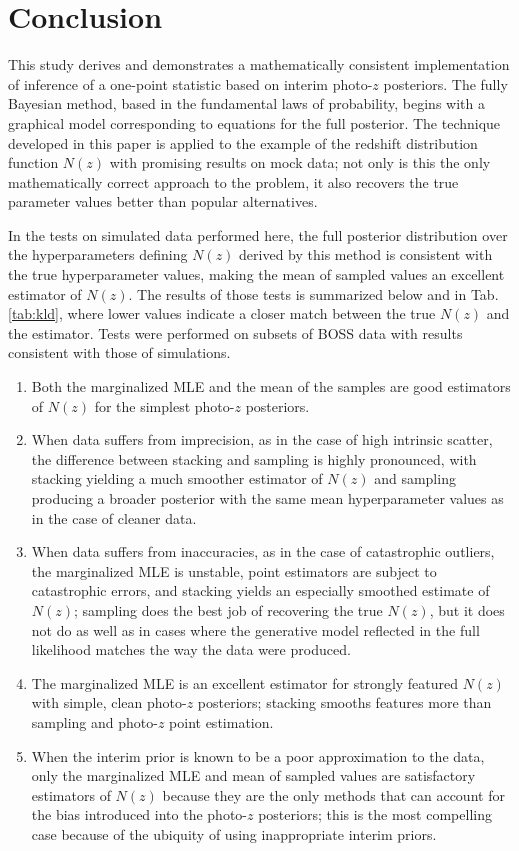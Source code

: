 \documentclass[preprint]{aastex}
\begin{document}
\clearpage
\section{Conclusion}
\label{sec:con}

This study derives and demonstrates a mathematically consistent implementation 
of inference of a one-point statistic based on interim photo-$z$ posteriors.  
The fully Bayesian method, based in the fundamental laws of probability, begins 
with a graphical model corresponding to equations for the full posterior.  The 
technique developed in this paper is applied to the example of the redshift 
distribution function $N(z)$ with promising results on mock data; not only is 
this the only mathematically correct approach to the problem, it also recovers 
the true parameter values better than popular alternatives.  

In the tests on simulated data performed here, the full posterior distribution 
over the hyperparameters defining $N(z)$ derived by this method is consistent 
with the true hyperparameter values, making the mean of sampled values an 
excellent estimator of $N(z)$.  The results of those tests is summarized below 
and in Tab. \ref{tab:kld}, where lower values indicate a closer match between 
the true $N(z)$ and the estimator.  Tests were performed on subsets of BOSS 
data with results consistent with those of simulations.

\begin{enumerate}
\item Both the marginalized MLE and the mean of the samples are good estimators 
of $N(z)$ for the simplest photo-$z$ posteriors.
\item When data suffers from imprecision, as in the case of high intrinsic 
scatter, the difference between stacking and sampling is highly pronounced, 
with stacking yielding a much smoother estimator of $N(z)$ and sampling 
producing a broader posterior with the same mean hyperparameter values as in 
the case of cleaner data.
\item When data suffers from inaccuracies, as in the case of catastrophic 
outliers, the marginalized MLE is unstable, point estimators are subject to 
catastrophic errors, and stacking yields an especially smoothed estimate of 
$N(z)$; sampling does the best job of recovering the true $N(z)$, but it does 
not do as well as in cases where the generative model reflected in the full 
likelihood matches the way the data were produced.
\item The marginalized MLE is an excellent estimator for strongly featured 
$N(z)$ with simple, clean photo-$z$ posteriors; stacking smooths features more 
than sampling and photo-$z$ point estimation.
\item When the interim prior is known to be a poor approximation to the data, 
only the marginalized MLE and mean of sampled values are satisfactory 
estimators of $N(z)$ because they are the only methods that can account for the 
bias introduced into the photo-$z$ posteriors; this is the most compelling case 
because of the ubiquity of using inappropriate interim priors.
\end{enumerate}
\end{document}
